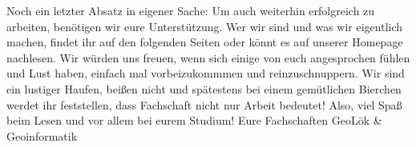 Noch ein letzter Absatz in eigener Sache: Um auch weiterhin erfolgreich zu arbeiten, benötigen wir eure Unterstützung. Wer wir sind und was wir eigentlich machen, findet ihr auf den folgenden Seiten oder könnt es auf unserer Homepage nachlesen. Wir würden uns freuen, wenn sich einige von euch angesprochen fühlen und Lust haben, einfach mal vorbeizukommmen und reinzuschnuppern. Wir sind ein lustiger Haufen, beißen nicht und spätestens bei einem gemütlichen Bierchen werdet ihr feststellen, dass Fachschaft nicht nur Arbeit bedeutet! Also, viel Spaß beim Lesen und vor allem bei eurem Studium!
\bigskip
\newline
Eure Fachschaften GeoLök \& Geoinformatik
